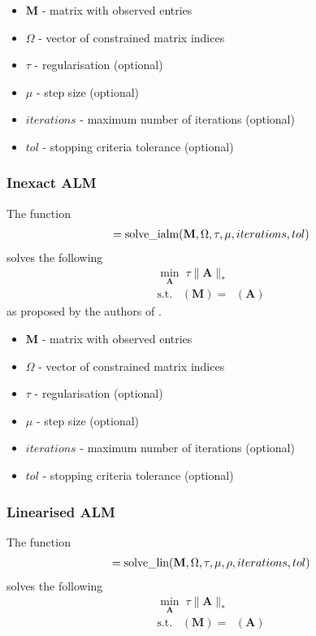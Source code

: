 \documentclass{article}
\DeclareMathOperator*{\pro}{\mathcal P_{\Omega}}
\begin{document}
\begin{itemize}
\item $\mathbf M$ - matrix with observed entries
\item $\Omega$ - vector of constrained matrix indices
\item $\tau$ - regularisation (optional)
\item $\mu$ - step size (optional)
\item $iterations$ - maximum number of iterations (optional)
\item $tol$ - stopping criteria tolerance (optional)
\end{itemize}

\subsubsection{Inexact ALM}

The function
\begin{align}
[ \mathbf A, \mathbf{f\_vals}, \mathbf{stop\_vals} ] = \text{solve\_ialm}( \mathbf M, \Omega, \tau, \mu, iterations, tol )\notag 
\end{align}
solves the following
\begin{align}
\min_{\mathbf A} \; \tau \| \mathbf A \|_* \\
\text{s.t.} \; \pro (\mathbf M) = \pro (\mathbf A) \nonumber 
\end{align}
as proposed by the authors of \cite{lin2010augmented}.

\begin{itemize}
\item $\mathbf M$ - matrix with observed entries
\item $\Omega$ - vector of constrained matrix indices
\item $\tau$ - regularisation (optional)
\item $\mu$ - step size (optional)
\item $iterations$ - maximum number of iterations (optional)
\item $tol$ - stopping criteria tolerance (optional)
\end{itemize}

\subsubsection{Linearised ALM}

The function
\begin{align}
[ \mathbf A, \mathbf{f\_vals}, \mathbf{stop\_vals} ] = \text{solve\_lin}( \mathbf M, \Omega, \tau, \mu, \rho, iterations, tol ) \notag 
\end{align}
solves the following
\begin{align}
\min_{\mathbf A} \; \tau \| \mathbf A \|_* \\
\text{s.t.} \; \pro (\mathbf M) = \pro (\mathbf A) \nonumber 
\end{align}
\end{document}
